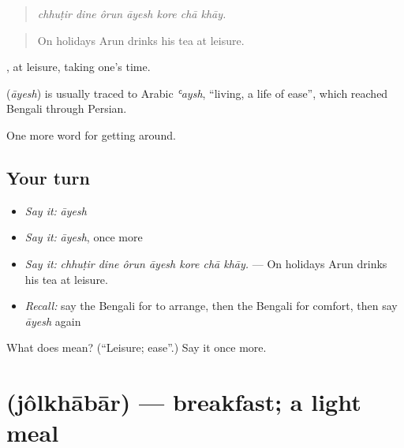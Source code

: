 \begin{quote}
      
\end{quote}

\begin{quote}
\emph{chhuṭir dine ôrun āyesh kore chā khāy.}
\end{quote}

\begin{quote}
On holidays Arun drinks his tea at leisure.
\end{quote}

 , at leisure, taking one's time.

\begin{cousinweb}
\textbf{} (\emph{āyesh}) is usually traced to Arabic \emph{ʿaysh}, \textquotedblleft{}living, a life of ease\textquotedblright{}, which reached Bengali through Persian.
\end{cousinweb}

\begin{grammarlens}[title={What you've built}]
One more word for getting around.
\end{grammarlens}

\subsection*{Your turn}
\begin{itemize}
\raggedright
  \item \emph{Say it:} \emph{āyesh}
  \item \emph{Say it:} \emph{āyesh}, once more
  \item \emph{Say it:} \emph{chhuṭir dine ôrun āyesh kore chā khāy.} — On holidays Arun drinks his tea at leisure.
  \item \emph{Recall:} say the Bengali for to arrange, then the Bengali for comfort, then say \emph{āyesh} again
\end{itemize}

\begin{tcolorbox}[breakable,colback=teal!4,colframe=teal!35!black,title={Before you move on}]
What does  mean? (\textquotedblleft{}Leisure; ease\textquotedblright{}.) Say it once more.
\end{tcolorbox}
\section[\texorpdfstring{\bn{জলখাবার} (jôlkhābār)}{জলখাবার (jôlkhābār)}]{ (jôlkhābār) — breakfast; a light meal}

